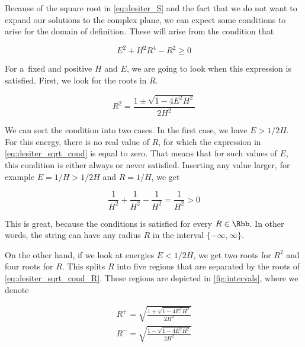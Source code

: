 Because of the square root in \cref{eq:desiter_S} and the fact that we do not want to expand our solutions to the complex plane, we can expect some conditions to arise for the domain of definition. These will arise from the condition that

\begin{equation}
\label{eq:desiter_sqrt_cond}
    E^2 + H^2 R^4 - R^2 \geq 0
\end{equation}

\noindent
For a~fixed and positive $H$ and $E$, we are going to look when this expression is satisfied. First, we look for the roots in $R$. 

\begin{equation}
\label{eq:desiter_sqrt_cond_R}
    R^2 = \frac{1 \pm \sqrt{1-4 E^2 H^2 }}{2H^2}
\end{equation}

\noindent
We can sort the condition into two cases. In the first case, we have $E>1/2H$. For this energy, there is no real value of $R$, for which the expression in \cref{eq:desiter_sqrt_cond} is equal to zero. That means that for such values of $E$, this condition is either always or never satisfied. Inserting any value larger, for example $E = 1/H > 1/2H$ and $R = 1/H$, we get

\begin{equation*}
    \frac{1}{H^2} + \frac{1}{H^2} - \frac{1}{H^2} = \frac{1}{H^2} > 0
\end{equation*}

\noindent
This is great, because the conditions is satisfied for every $R \in \Rbb$. In other words, the string can have any radius $R$ in the interval $\{-\infty, \infty\}$. 

On the other hand, if we look at energies $E < 1/2H$, we get two roots for $R^2$ and four roots for $R$. This splits $R$ into five regions that are separated by the roots of \cref{eq:desiter_sqrt_cond_R}. These regions are depicted in \cref{fig:intervals}, where we denote

\begin{equation}
\label{eq:desiter_r0}
    \begin{aligned}
    R^{+} = \sqrt{\frac{1 + \sqrt{1 - 4 E^2 H^2}}{2H^2}} \\
    R^{-} = \sqrt{\frac{1 - \sqrt{1 - 4 E^2 H^2}}{2H^2}}
    \end{aligned}
\end{equation}

